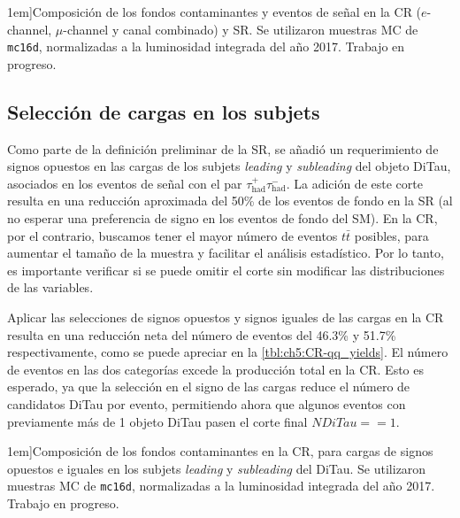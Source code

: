 \begin{table}[t]
    \footnotesize
    \setlength{\tabcolsep}{1mm}
    

    \caption[][1em]{Composición de los fondos contaminantes y eventos de señal en la CR ($e$-channel, $\mu$-channel y canal combinado) y SR. Se utilizaron muestras MC de \texttt{mc16d}, normalizadas a la luminosidad integrada del año 2017. Trabajo en progreso.}
    \label{tbl:ch5:CR-SR_yields}
\end{table}


\subsection{Selección de cargas en los subjets}

Como parte de la definición preliminar de la SR, se añadió un requerimiento de signos opuestos en las cargas de los subjets \textit{leading} y \textit{subleading} del objeto DiTau, asociados en los eventos de señal con el par $\tau_{\text{had}}^+\tau_{\text{had}}^-$. La adición de este corte resulta en una reducción aproximada del 50\% de los eventos de fondo en la SR (al no esperar una preferencia de signo en los eventos de fondo del SM). En la CR, por el contrario, buscamos tener el mayor número de eventos $t\bar{t}$ posibles, para aumentar el tamaño de la muestra y facilitar el análisis estadístico. Por lo tanto, es importante verificar si se puede omitir el corte sin modificar las distribuciones de las variables.

Aplicar las selecciones de signos opuestos y signos iguales de las cargas en la CR resulta en una reducción neta del número de eventos del 46.3\% y 51.7\% respectivamente, como se puede apreciar en la \cref{tbl:ch5:CR-qq_yields}. El número de eventos en las dos categorías excede la producción total en la CR. Esto es esperado, ya que la selección en el signo de las cargas reduce el número de candidatos DiTau por evento, permitiendo ahora que algunos eventos con previamente más de 1 objeto DiTau pasen el corte final $NDiTau == 1$.

\begin{table}[t]
    \footnotesize
    \setlength{\tabcolsep}{1mm}
    

    \caption[][1em]{Composición de los fondos contaminantes en la CR, para cargas de signos opuestos e iguales en los subjets \textit{leading} y \textit{subleading} del DiTau. Se utilizaron muestras MC de \texttt{mc16d}, normalizadas a la luminosidad integrada del año 2017. Trabajo en progreso.}
    \label{tbl:ch5:CR-qq_yields}
\end{table}

